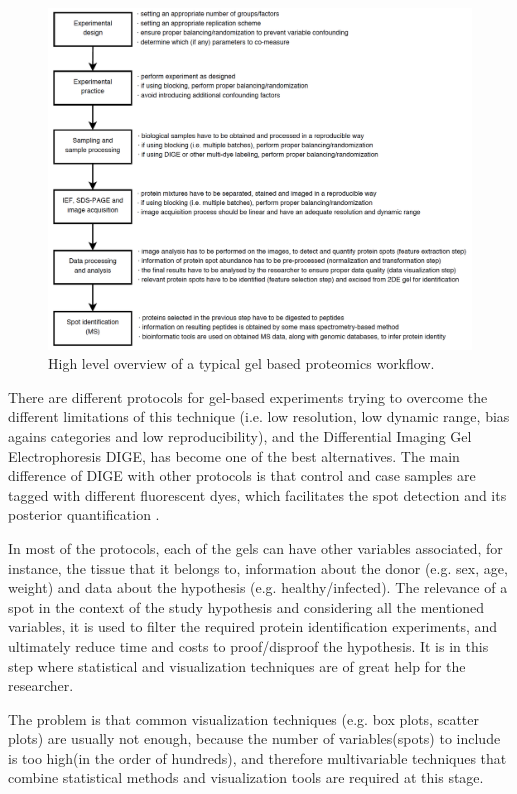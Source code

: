 \begin{figure}  
\centering
\includegraphics[width=\textwidth]{figures/gel-based.png}
\caption[High level overview of a typical gel based proteomics workflow.]{High level overview of a typical gel based proteomics workflow.
\label{fig:gelflow}}
\end{figure}

There are different protocols for gel-based experiments trying to overcome the different limitations of this technique (i.e. low resolution, low dynamic range, bias agains categories and low reproducibility), and the Differential Imaging Gel Electrophoresis DIGE, has become one of the best alternatives. The main difference of DIGE with other protocols is that control and case samples are tagged with different fluorescent dyes, which facilitates the spot detection and its posterior quantification \cite{PAN2008}.

In most of the protocols, each of the gels can have other variables associated, for instance, the tissue that it belongs to, information about the donor (e.g. sex, age, weight) and data about the hypothesis (e.g. healthy/infected). The relevance of a spot in the context of the study hypothesis and considering all the mentioned variables, it is used to filter the required protein identification experiments, and ultimately reduce time and costs to proof/disproof the hypothesis. It is in this step where statistical and visualization techniques are of great help for the researcher.

The problem is that common visualization techniques (e.g. box plots, scatter plots) are usually not enough, because the number of variables(spots) to include is too high(in the order of hundreds), and therefore multivariable techniques that combine statistical methods and visualization tools are required at this stage.

